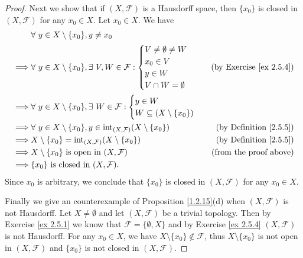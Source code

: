 \begin{proof}
    Next we show that if \((X, \mathcal{F})\) is a Hausdorff space, then \(\{x_0\}\) is closed in \((X, \mathcal{F})\) for any \(x_0 \in X\).
    Let \(x_0 \in X\).
    We have
    \begin{align*}
                 & \forall\ y \in X \setminus \{x_0\}, y \neq x_0                                                                                        \\
        \implies & \forall\ y \in X \setminus \{x_0\}, \exists\ V, W \in \mathcal{F} : \begin{cases}
            V \neq \emptyset \neq W \\
            x_0 \in V               \\
            y \in W                 \\
            V \cap W = \emptyset
        \end{cases} & \text{(by Exercise \ref{ex 2.5.4})} \\
        \implies & \forall\ y \in X \setminus \{x_0\}, \exists\ W \in \mathcal{F} : \begin{cases}
            y \in W \\
            W \subseteq (X \setminus \{x_0\})
        \end{cases}                                          \\
        \implies & \forall\ y \in X \setminus \{x_0\}, y \in \text{int}_{(X, \mathcal{F})}(X \setminus \{x_0\})    & \text{(by Definition \ref{2.5.5})}  \\
        \implies & X \setminus \{x_0\} = \text{int}_{(X, \mathcal{F})}(X \setminus \{x_0\})                        & \text{(by Definition \ref{2.5.5})}  \\
        \implies & X \setminus \{x_0\} \text{ is open in } (X, \mathcal{F})                                        & \text{(from the proof above)}       \\
        \implies & \{x_0\} \text{ is closed in } (X, \mathcal{F}).
    \end{align*}
    Since \(x_0\) is arbitrary, we conclude that \(\{x_0\}\) is closed in \((X, \mathcal{F})\) for any \(x_0 \in X\).

    Finally we give an counterexample of Proposition \ref{1.2.15}(d) when \((X, \mathcal{F})\) is not Hausdorff.
    Let \(X \neq \emptyset\) and let \((X, \mathcal{F})\) be a trivial topology.
    Then by Exercise \ref{ex 2.5.1} we know that \(\mathcal{F} = \{\emptyset, X\}\) and by Exercise \ref{ex 2.5.4} \((X, \mathcal{F})\) is not Hausdorff.
    For any \(x_0 \in X\), we have \(X \setminus \{x_0\} \notin \mathcal{F}\), thus \(X \setminus \{x_0\}\) is not open in \((X, \mathcal{F})\) and \(\{x_0\}\) is not closed in \((X, \mathcal{F})\).
\end{proof}


